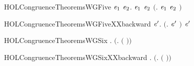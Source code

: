 \begin{SaveVerbatim}{HOLCongruenceTheoremsWGFive}
\HOLTokenTurnstile{} \HOLSymConst{\HOLTokenForall{}}\ensuremath{\HOLBoundVar{e}\sb{\mathrm{1}}} \ensuremath{\HOLBoundVar{e}\sb{\mathrm{2}}}.  \ensuremath{\HOLBoundVar{e}\sb{\mathrm{1}}} \HOLSymConst{\HOLTokenConj{}}  \ensuremath{\HOLBoundVar{e}\sb{\mathrm{2}}} \HOLSymConst{\HOLTokenImp{}}  \ensuremath{(}\HOLTokenLambda{}. \ensuremath{\HOLBoundVar{e}\sb{\mathrm{1}}}  \HOLSymConst{\ensuremath{\mid}} \ensuremath{\HOLBoundVar{e}\sb{\mathrm{2}}} \ensuremath{)}
\end{SaveVerbatim}
\newcommand{\HOLCongruenceTheoremsWGFive}{\UseVerbatim{HOLCongruenceTheoremsWGFive}}
\begin{SaveVerbatim}{HOLCongruenceTheoremsWGFiveXXbackward}
\HOLTokenTurnstile{} \HOLSymConst{\HOLTokenForall{}} \ensuremath{\HOLBoundVar{e}\sp{\prime}}.  \ensuremath{(}\HOLTokenLambda{}.   \HOLSymConst{\ensuremath{\mid}} \ensuremath{\HOLBoundVar{e}\sp{\prime}} \ensuremath{)} \HOLSymConst{\HOLTokenImp{}}   \HOLSymConst{\HOLTokenConj{}}  \ensuremath{\HOLBoundVar{e}\sp{\prime}}
\end{SaveVerbatim}
\newcommand{\HOLCongruenceTheoremsWGFiveXXbackward}{\UseVerbatim{HOLCongruenceTheoremsWGFiveXXbackward}}
\begin{SaveVerbatim}{HOLCongruenceTheoremsWGSix}
\HOLTokenTurnstile{} \HOLSymConst{\HOLTokenForall{}} .   \HOLSymConst{\HOLTokenImp{}}  \ensuremath{(}\HOLTokenLambda{}.   \ensuremath{(} \ensuremath{)}\ensuremath{)}
\end{SaveVerbatim}
\newcommand{\HOLCongruenceTheoremsWGSix}{\UseVerbatim{HOLCongruenceTheoremsWGSix}}
\begin{SaveVerbatim}{HOLCongruenceTheoremsWGSixXXbackward}
\HOLTokenTurnstile{} \HOLSymConst{\HOLTokenForall{}} .  \ensuremath{(}\HOLTokenLambda{}.   \ensuremath{(} \ensuremath{)}\ensuremath{)} \HOLSymConst{\HOLTokenImp{}}  
\end{SaveVerbatim}
\newcommand{\HOLCongruenceTheoremsWGSixXXbackward}{\UseVerbatim{HOLCongruenceTheoremsWGSixXXbackward}}
